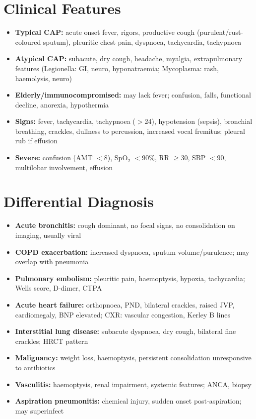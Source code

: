 \section*{Clinical Features}
\begin{itemize}
    \item \textbf{Typical CAP:} acute onset fever, rigors, productive cough (purulent/rust-coloured sputum), pleuritic chest pain, dyspnoea, tachycardia, tachypnoea
    \item \textbf{Atypical CAP:} subacute, dry cough, headache, myalgia, extrapulmonary features (Legionella: GI, neuro, hyponatraemia; Mycoplasma: rash, haemolysis, neuro)
    \item \textbf{Elderly/immunocompromised:} may lack fever; confusion, falls, functional decline, anorexia, hypothermia
    \item \textbf{Signs:} fever, tachycardia, tachypnoea ($>$24), hypotension (sepsis), bronchial breathing, crackles, dullness to percussion, increased vocal fremitus; pleural rub if effusion
    \item \textbf{Severe:} confusion (AMT $<$8), SpO$_2$ $<$90\%, RR $\ge$30, SBP $<$90, multilobar involvement, effusion
\end{itemize}

\section*{Differential Diagnosis}
\begin{itemize}
    \item \textbf{Acute bronchitis:} cough dominant, no focal signs, no consolidation on imaging, usually viral
    \item \textbf{COPD exacerbation:} increased dyspnoea, sputum volume/purulence; may overlap with pneumonia
    \item \textbf{Pulmonary embolism:} pleuritic pain, haemoptysis, hypoxia, tachycardia; Wells score, D-dimer, CTPA
    \item \textbf{Acute heart failure:} orthopnoea, PND, bilateral crackles, raised JVP, cardiomegaly, BNP elevated; CXR: vascular congestion, Kerley B lines
    \item \textbf{Interstitial lung disease:} subacute dyspnoea, dry cough, bilateral fine crackles; HRCT pattern
    \item \textbf{Malignancy:} weight loss, haemoptysis, persistent consolidation unresponsive to antibiotics
    \item \textbf{Vasculitis:} haemoptysis, renal impairment, systemic features; ANCA, biopsy
    \item \textbf{Aspiration pneumonitis:} chemical injury, sudden onset post-aspiration; may superinfect
\end{itemize}

